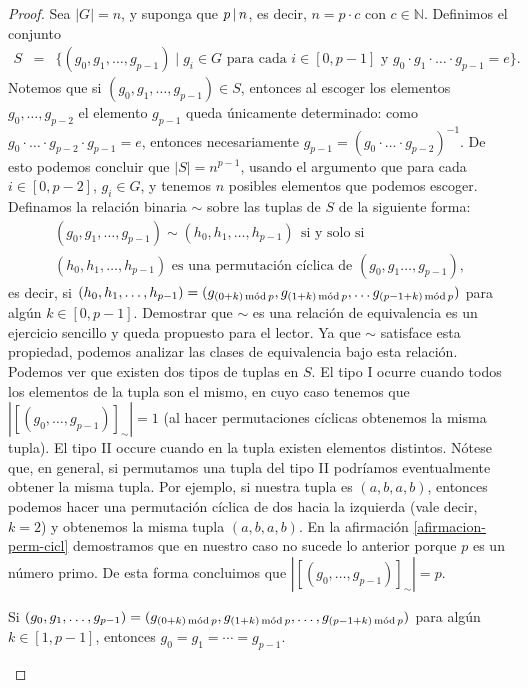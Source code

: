 \begin{proof}
Sea $|G|= n $, y suponga que $p\divi n$, es decir, $n= p\cdot c$ con
$c\in \mathbb{N}$. Definimos el conjunto
\begin{eqnarray*}
S & = & \{(g_0,g_1,\ldots,g_{p-1})\mid g_i\in G \text{ para cada }
i \in [0,p-1] \text{ y } g_0 \cdot g_1 \cdot \ldots \cdot g_{p-1} =
e\}.
\end{eqnarray*}
Notemos que si $(g_0,g_1,\ldots,g_{p-1})\in S$, entonces al escoger
los elementos $g_0,\ldots,g_{p-2}$ el elemento $g_{p-1}$ queda
únicamente determinado: como $g_0 \cdot \ldots \cdot g_{p-2}\cdot
g_{p-1}=e$, entonces necesariamente $g_{p-1} = (g_0 \cdot \ldots \cdot
g_{p-2})^{-1}$. De esto podemos concluir que $|S|=n^{p-1}$, usando el
argumento que para cada $i\in [0,p-2]$, $g_i\in G$, y tenemos $n$
posibles elementos que podemos escoger. Definamos la relación binaria
$\sim$ sobre las tuplas de $S$ de la siguiente forma:
\begin{multline*}
(g_0,g_1,\ldots,g_{p-1})\sim (h_0,h_1,\ldots,h_{p-1}) \ \ \text{si y solo si} \\
(h_0,h_1,\ldots,h_{p-1})\text{ es una permutación cíclica de } (g_0,g_1\ldots,g_{p-1}), 
\end{multline*}
es decir, si $(h_0,h_1,\ldots,h_{p-1}) = (g_{(0+k) \mods p},
g_{(1+k) \mods p}, \ldots g_{(p-1+k) \mods p})$ para algún $k\in
[0,p-1]$. Demostrar que $\sim$ es una relación de equivalencia es un
ejercicio sencillo y queda propuesto para el lector.  Ya que $\sim$
satisface esta propiedad, podemos analizar las clases de equivalencia
bajo esta relación.  Podemos ver que existen dos tipos de tuplas en
$S$.  El tipo I ocurre cuando todos los elementos de la tupla son el
mismo, en cuyo caso tenemos que $|[(g_0,\ldots,g_{p-1})]_{\sim}|=1$
(al hacer permutaciones cíclicas obtenemos la misma tupla).  El tipo
II occure cuando en la tupla existen elementos distintos. Nótese que, en general, si permutamos una tupla del tipo II podríamos eventualmente obtener la misma tupla. Por ejemplo, si nuestra tupla es $(a,b,a,b)$, entonces podemos hacer una permutación cíclica de dos hacia la izquierda (vale decir, $k = 2$) y obtenemos la misma tupla $(a,b,a,b)$. En la afirmación \ref{afirmacion-perm-cicl} demostramos que
en nuestro caso no sucede lo anterior porque $p$ es un número primo.
De esta forma concluimos que $|[(g_0,\ldots,g_{p-1})]_{\sim}|=p$.


\begin{afirmacion}\label{afirmacion-perm-cicl}
Si $(g_0, g_1, \ldots, g_{p-1}) = (g_{(0+k) \mods p}, g_{(1+k) \mods
p}, \ldots, g_{(p-1+k) \mods p})$ para algún $k \in [1,p-1]$, entonces
$g_0 = g_1 = \cdots = g_{p-1}$.
\end{afirmacion}


\end{proof}

